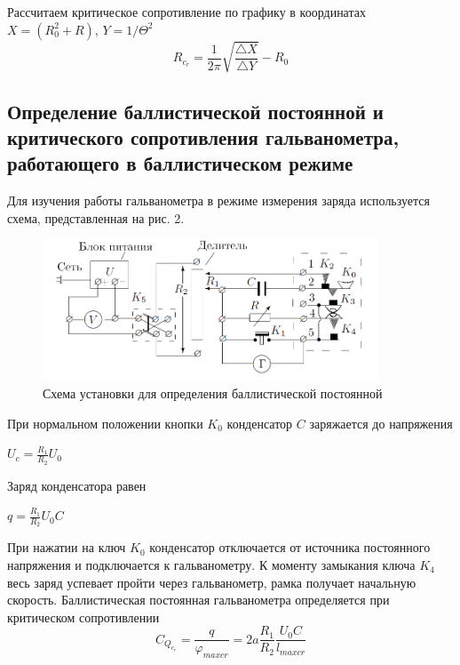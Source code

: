 \documentclass[a4paper]{article}
\begin{document}
Рассчитаем критическое сопротивление по графику в координатах $X = (R_0^2 + R)$, $Y = 1/\Theta^2$
\begin{equation}
    R_c_r = \frac{1}{2\pi}\sqrt{\frac{\triangle X}{\triangle Y}} - R_0
\end{equation}

\subsection{Определение баллистической постоянной и критического сопротивления гальванометра, работающего в баллистическом режиме}

Для изучения работы гальванометра в режиме измерения заряда используется схема, представленная на рис. 2.

\begin{figure}[h]
    \centering
    \includegraphics[width=10cm]{fig1.PNG}
    \caption{Схема установки для определения баллистической постоянной}
    \label{fig:vac}
\end{figure}

При нормальном положении кнопки $K_0$ конденсатор $C$ заряжается до напряжения
\begin{center}
    $U_c = \frac{R_1}{R_2}U_0$
\end{center}
Заряд конденсатора равен
\begin{center}
    $q = \frac{R_1}{R_2}U_0 C$
\end{center}
При нажатии на ключ $K_0$ конденсатор отключается от источника постоянного напряжения и подключается к гальванометру. К моменту замыкания ключа $K_4$ весь заряд успевает пройти через гальванометр, рамка получает начальную скорость. Баллистическая постоянная гальванометра определяется при критическом сопротивлении
\begin{equation}
    C_Q_c_r = \frac{q}{\varphi_{max cr}} = 2a\frac{R_1}{R_2} \frac{U_0 C}{l_{max cr}}
\end{equation}
\end{document}
